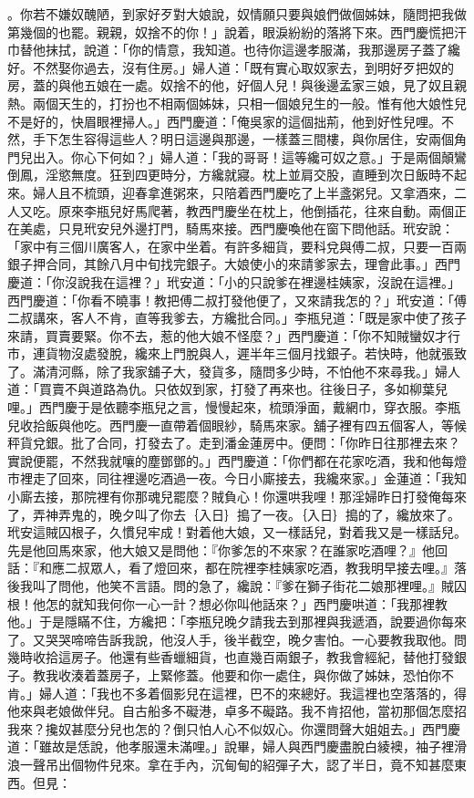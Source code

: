 。你若不嫌奴醜陋，到家好歹對大娘說，奴情願只要與娘們做個姊妹，隨問把我做第幾個的也罷。親親，奴捨不的你！」說着，眼淚紛紛的落將下來。西門慶慌把汗巾替他抹拭，說道：「你的情意，我知道。也待你這邊孝服滿，我那邊房子蓋了纔好。不然娶你過去，沒有住房。」婦人道：「既有實心取奴家去，到明好歹把奴的房，蓋的與他五娘在一處。奴捨不的他，好個人兒！與後邊孟家三娘，見了奴且親熱。兩個天生的，打扮也不相兩個姊妹，只相一個娘兒生的一般。惟有他大娘性兒不是好的，快眉眼裡掃人。」西門慶道：「俺吳家的這個拙荊，他到好性兒哩。不然，手下怎生容得這些人？明日這邊與那邊，一樣蓋三間樓，與你居住，安兩個角門兒出入。你心下何如？」婦人道：「我的哥哥！這等纔可奴之意。」于是兩個顛鸞倒鳳，淫慾無度。狂到四更時分，方纔就寢。枕上並肩交股，直睡到次日飯時不起來。婦人且不梳頭，迎春拿進粥來，只陪着西門慶吃了上半盞粥兒。又拿酒來，二人又吃。原來李瓶兒好馬爬著，教西門慶坐在枕上，他倒插花，往來自動。兩個正在美處，只見玳安兒外邊打門，騎馬來接。西門慶喚他在窗下問他話。玳安說：「家中有三個川廣客人，在家中坐着。有許多細貨，要科兌與傅二叔，只要一百兩銀子押合同，其餘八月中旬找完銀子。大娘使小的來請爹家去，理會此事。」西門慶道：「你沒說我在這裡？」玳安道：「小的只說爹在裡邊桂姨家，沒說在這裡。」西門慶道：「你看不曉事！教把傅二叔打發他便了，又來請我怎的？」玳安道：「傅二叔講來，客人不肯，直等我爹去，方纔批合同。」李瓶兒道：「既是家中使了孩子來請，買賣要緊。你不去，惹的他大娘不怪麼？」西門慶道：「你不知賊蠻奴才行巿，連貨物沒處發脫，纔來上門脫與人，遲半年三個月找銀子。若快時，他就張致了。滿清河縣，除了我家舖子大，發貨多，隨問多少時，不怕他不來尋我。」婦人道：「買賣不與道路為仇。只依奴到家，打發了再來也。往後日子，多如柳葉兒哩。」西門慶于是依聽李瓶兒之言，慢慢起來，梳頭淨面，戴網巾，穿衣服。李瓶兒收拾飯與他吃。西門慶一直帶着個眼紗，騎馬來家。舖子裡有四五個客人，等候秤貨兌銀。批了合同，打發去了。走到潘金蓮房中。便問：「你昨日往那裡去來？實說便罷，不然我就嚷的塵鄧鄧的。」西門慶道：「你們都在花家吃酒，我和他每燈巿裡走了回來，同往裡邊吃酒過一夜。今日小廝接去，我纔來家。」金蓮道：「我知小廝去接，那院裡有你那魂兒罷麼？賊負心！你還哄我哩！那淫婦昨日打發俺每來了，弄神弄鬼的，晚夕叫了你去｛入日｝搗了一夜。｛入日｝搗的了，纔放來了。玳安這賊囚根子，久慣兒牢成！對着他大娘，又一樣話兒，對着我又是一樣話兒。先是他回馬來家，他大娘又是問他：『你爹怎的不來家？在誰家吃酒哩？』他回話：『和應二叔眾人，看了燈回來，都在院裡李桂姨家吃酒，教我明早接去哩。』落後我叫了問他，他笑不言語。問的急了，纔說：『爹在獅子街花二娘那裡哩。』賊囚根！他怎的就知我何你一心一計？想必你叫他話來？」西門慶哄道：「我那裡教他。」于是隱瞞不住，方纔把：「李瓶兒晚夕請我去到那裡與我遞酒，說要過你每來了。又哭哭啼啼告訴我說，他沒人手，後半截空，晚夕害怕。一心要教我取他。問幾時收拾這房子。他還有些香蠟細貨，也直幾百兩銀子，教我會經紀，替他打發銀子。教我收湊着蓋房子，上緊修蓋。他要和你一處住，與你做了姊妹，恐怕你不肯。」婦人道：「我也不多着個影兒在這裡，巴不的來總好。我這裡也空落落的，得他來與老娘做伴兒。自古船多不礙港，卓多不礙路。我不肯招他，當初那個怎麼招我來？攙奴甚麼分兒也怎的？倒只怕人心不似奴心。你還問聲大姐姐去。」西門慶道：「雖故是恁說，他孝服還未滿哩。」說畢，婦人與西門慶盡脫白綾襖，袖子裡滑浪一聲吊出個物件兒來。拿在手內，沉甸甸的紹彈子大，認了半日，竟不知甚麼東西。但見：

